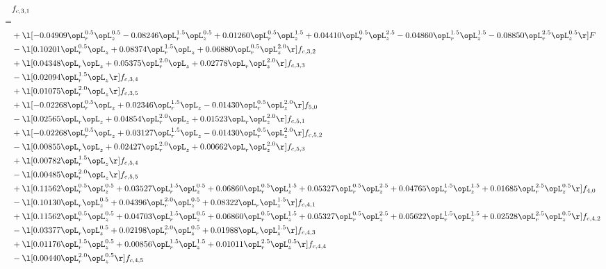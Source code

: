 \begin{alignat}{2} 
\label{eq:f_31_2} 
& f_{c,3,1} \nonumber \\ 
 = \\ 
& + \l[  -0.04909 \opL_r^{0.5} \opL_z^{0.5}   -0.08246 \opL_r^{1.5} \opL_z^{0.5} +  0.01260 \opL_r^{0.5} \opL_z^{1.5} +  0.04410 \opL_r^{0.5} \opL_z^{2.5}   -0.04860 \opL_r^{1.5} \opL_z^{1.5}   -0.08850 \opL_r^{2.5} \opL_z^{0.5}  \r] F \nonumber \\ 
& - \l[  0.10201 \opL_r^{0.5} \opL_z +  0.08374 \opL_r^{1.5} \opL_z +  0.06880 \opL_r^{0.5} \opL_z^{2.0}  \r] f_{c,3,2} \nonumber \\ 
& + \l[  0.04348 \opL_r \opL_z +  0.05375 \opL_r^{2.0} \opL_z +  0.02778 \opL_r \opL_z^{2.0}  \r] f_{c,3,3} \nonumber \\ 
& - \l[  0.02094 \opL_r^{1.5} \opL_z  \r] f_{c,3,4} \nonumber \\ 
& + \l[  0.01075 \opL_r^{2.0} \opL_z  \r] f_{c,3,5} \nonumber \\ 
& + \l[  -0.02268 \opL_r^{0.5} \opL_z +  0.02346 \opL_r^{1.5} \opL_z   -0.01430 \opL_r^{0.5} \opL_z^{2.0}  \r] f_{5,0} \nonumber \\ 
& - \l[  0.02565 \opL_r \opL_z +  0.04854 \opL_r^{2.0} \opL_z +  0.01523 \opL_r \opL_z^{2.0}  \r] f_{c,5,1} \nonumber \\ 
& + \l[  -0.02268 \opL_r^{0.5} \opL_z +  0.03127 \opL_r^{1.5} \opL_z   -0.01430 \opL_r^{0.5} \opL_z^{2.0}  \r] f_{c,5,2} \nonumber \\ 
& - \l[  0.00855 \opL_r \opL_z +  0.02427 \opL_r^{2.0} \opL_z +  0.00662 \opL_r \opL_z^{2.0}  \r] f_{c,5,3} \nonumber \\ 
& + \l[  0.00782 \opL_r^{1.5} \opL_z  \r] f_{c,5,4} \nonumber \\ 
& - \l[  0.00485 \opL_r^{2.0} \opL_z  \r] f_{c,5,5} \nonumber \\ 
& + \l[  0.11562 \opL_r^{0.5} \opL_z^{0.5} +  0.03527 \opL_r^{1.5} \opL_z^{0.5} +  0.06860 \opL_r^{0.5} \opL_z^{1.5} +  0.05327 \opL_r^{0.5} \opL_z^{2.5} +  0.04765 \opL_r^{1.5} \opL_z^{1.5} +  0.01685 \opL_r^{2.5} \opL_z^{0.5}  \r] f_{4,0} \nonumber \\ 
& - \l[  0.10130 \opL_r \opL_z^{0.5} +  0.04396 \opL_r^{2.0} \opL_z^{0.5} +  0.08322 \opL_r \opL_z^{1.5}  \r] f_{c,4,1} \nonumber \\ 
& + \l[  0.11562 \opL_r^{0.5} \opL_z^{0.5} +  0.04703 \opL_r^{1.5} \opL_z^{0.5} +  0.06860 \opL_r^{0.5} \opL_z^{1.5} +  0.05327 \opL_r^{0.5} \opL_z^{2.5} +  0.05622 \opL_r^{1.5} \opL_z^{1.5} +  0.02528 \opL_r^{2.5} \opL_z^{0.5}  \r] f_{c,4,2} \nonumber \\ 
& - \l[  0.03377 \opL_r \opL_z^{0.5} +  0.02198 \opL_r^{2.0} \opL_z^{0.5} +  0.01988 \opL_r \opL_z^{1.5}  \r] f_{c,4,3} \nonumber \\ 
& + \l[  0.01176 \opL_r^{1.5} \opL_z^{0.5} +  0.00856 \opL_r^{1.5} \opL_z^{1.5} +  0.01011 \opL_r^{2.5} \opL_z^{0.5}  \r] f_{c,4,4} \nonumber \\ 
& - \l[  0.00440 \opL_r^{2.0} \opL_z^{0.5}  \r] f_{c,4,5} \nonumber \\ 
\end{alignat} 


